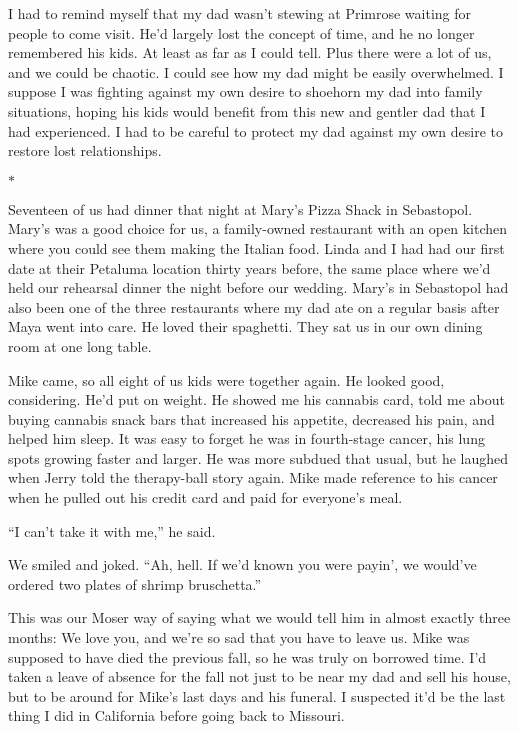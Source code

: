 \documentclass[12pt]{book}
\begin{document}
I had to remind myself that my dad wasn't stewing at Primrose waiting for people to come visit. He'd largely lost the concept of time, and he no longer remembered his kids. At least as far as I could tell. Plus there were a lot of us, and we could be chaotic. I could see how my dad might be easily overwhelmed. I suppose I was fighting against my own desire to shoehorn my dad into family situations, hoping his kids would benefit from this new and gentler dad that I had experienced. I had to be careful to protect my dad against my own desire to restore lost relationships.

\begin{center}$*$\end{center}

Seventeen of us had dinner that night at Mary's Pizza Shack in Sebastopol. Mary's was a good choice for us, a family-owned restaurant with an open kitchen where you could see them making the Italian food. Linda and I had had our first date at their Petaluma location thirty years before, the same place where we'd held our rehearsal dinner the night before our wedding. Mary's in Sebastopol had also been one of the three restaurants where my dad ate on a regular basis after Maya went into care. He loved their spaghetti. They sat us in our own dining room at one long table.

Mike came, so all eight of us kids were together again. He looked good, considering. He'd put on weight. He showed me his cannabis card, told me about buying cannabis snack bars that increased his appetite, decreased his pain, and helped him sleep. It was easy to forget he was in fourth-stage cancer, his lung spots growing faster and larger. He was more subdued that usual, but he laughed when Jerry told the therapy-ball story again. Mike made reference to his cancer when he pulled out his credit card and paid for everyone's meal.

``I can't take it with me,'' he said.

We smiled and joked. ``Ah, hell. If we'd known you were payin', we would've ordered two plates of shrimp bruschetta.''

This was our Moser way of saying what we would tell him in almost exactly three months: We love you, and we're so sad that you have to leave us. Mike was supposed to have died the previous fall, so he was truly on borrowed time. I'd taken a leave of absence for the fall not just to be near my dad and sell his house, but to be around for Mike's last days and his funeral. I suspected it'd be the last thing I did in California before going back to Missouri.
\end{document}
